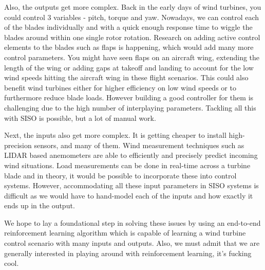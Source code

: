 \documentclass[hyperref,final,beleg]{cgvpub}
\begin{document}
Also, the outputs get more complex. Back in the early days of wind turbines, you could control 3 variables - pitch, torque and yaw. Nowadays, we can control each of the blades individually and with a quick enough response time to wiggle the blades around within one single rotor rotation. Research on adding active control elements to the blades such as flaps is happening, which would add many more control parameters. You might have seen flaps on an aircraft wing, extending the length of the wing or adding gaps at takeoff and landing to account for the low wind speeds hitting the aircraft wing in these flight scenarios. This could also benefit wind turbines either for higher efficiency on low wind speeds or to furthermore reduce blade loads. However building a good controller for them is challenging due to the high number of interplaying parameters. Tackling all this with \ac{SISO} is possible, but a lot of manual work.

Next, the inputs also get more complex. It is getting cheaper to install high-precision sensors, and many of them. Wind measurement techniques such as LIDAR based anemometers are able to efficiently and precisely predict incoming wind situations. Load measurements can be done in real-time across a turbine blade and in theory, it would be possible to incorporate these into control systems. However, accommodating all these input parameters in \ac{SISO} systems is difficult as we would have to hand-model each of the inputs and how exactly it ends up in the output.

We hope to lay a foundational step in solving these issues by using an end-to-end reinforcement learning algorithm which is capable of learning a wind turbine control scenario with many inputs and outputs. Also, we must admit that we are generally interested in playing around with reinforcement learning, it's fucking cool.
\end{document}
